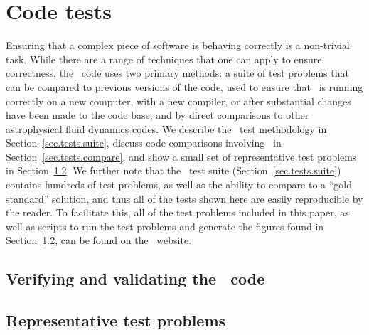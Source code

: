 
\section{Code tests}
\label{sec.tests}

Ensuring that a complex piece of software is behaving correctly is a
non-trivial task.  While there are a range of techniques that one can
apply to ensure correctness, the \enzo\ code uses two primary methods:
a suite of test problems that can be compared to previous versions of
the code, used to ensure that \enzo\ is running correctly on a new
computer, with a new compiler, or after substantial changes have been
made to the code base; and by direct comparisons to other
astrophysical fluid dynamics codes.  We describe the \enzo\ test
methodology in Section~\ref{sec.tests.suite}, discuss code comparisons
involving \enzo\ in Section~\ref{sec.tests.compare}, and show a small
set of representative test problems in
Section~\ref{sec.tests.problems}.  We further note that the \enzo\
test suite (Section~\ref{sec.tests.suite}) contains hundreds of test
problems, as well as the ability to compare to a ``gold standard''
solution, and thus all of the tests shown here are easily reproducible
by the reader.  To facilitate this, all of the test problems included
in this paper, as well as scripts to run the test problems and
generate the figures found in Section~\ref{sec.tests.problems}, can be
found on the \enzo\ website.

\subsection{Verifying and validating the \enzo\ code}
\label{sec.tests.vandv}



\subsection{Representative test problems}
\label{sec.tests.problems}

